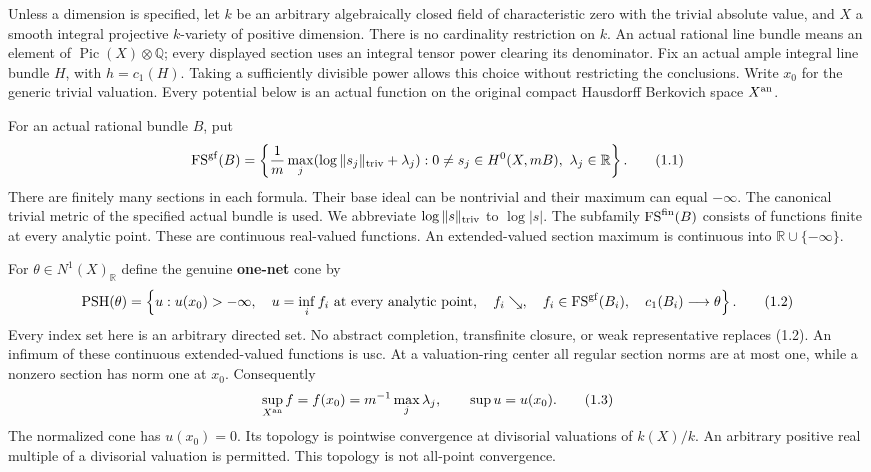 \documentclass[
  10pt,
]{article}
\begin{document}
Unless a dimension is specified, let \(k\) be an arbitrary algebraically
closed field of characteristic zero with the trivial absolute value, and
\(X\) a smooth integral projective \(k\)-variety of positive dimension.
There is no cardinality restriction on \(k\). An actual rational line
bundle means an element of \(\operatorname{Pic}(X)\otimes\mathbb Q\);
every displayed section uses an integral tensor power clearing its
denominator. Fix an actual ample integral line bundle \(H\), with
\(h=c_1(H)\). Taking a sufficiently divisible power allows this choice
without restricting the conclusions. Write \(x_0\) for the generic
trivial valuation. Every potential below is an actual function on the
original compact Hausdorff Berkovich space \(X^{\rm an}\).

For an actual rational bundle \(B\), put \[
 \operatorname{FS}^{\rm gf}(B)=\left\{
  \frac1m\max_j(\log\|s_j\|_{\rm triv}+\lambda_j):
 0\ne s_j\in H^0(X,mB),\ \lambda_j\in\mathbb R
 \right\}.                                                     \tag{1.1}
\] There are finitely many sections in each formula. Their base ideal
can be nontrivial and their maximum can equal \(-\infty\). The canonical
trivial metric of the specified actual bundle is used. We abbreviate
\(\log\|s\|_{\rm triv}\) to \(\log|s|\). The subfamily
\(\operatorname{FS}^{\rm fin}(B)\) consists of functions finite at every
analytic point. These are continuous real-valued functions. An
extended-valued section maximum is continuous into
\(\mathbb R\cup\{-\infty\}\).

For \(\theta\in N^1(X)_{\mathbb R}\) define the genuine \textbf{one-net}
cone by \[
 \operatorname{PSH}(\theta)=\left\{u:
 u(x_0)>-\infty,\quad u=\inf_i f_i\text{ at every analytic point},
 \quad f_i\searrow,\quad f_i\in\operatorname{FS}^{\rm gf}(B_i),
 \quad c_1(B_i)\longrightarrow\theta\right\}.                    \tag{1.2}
\] Every index set here is an arbitrary directed set. No abstract
completion, transfinite closure, or weak representative replaces (1.2).
An infimum of these continuous extended-valued functions is usc. At a
valuation-ring center all regular section norms are at most one, while a
nonzero section has norm one at \(x_0\). Consequently \[
 \sup_{X^{\rm an}} f=f(x_0)=m^{-1}\max_j\lambda_j,
 \qquad \sup u=u(x_0).                                          \tag{1.3}
\] The normalized cone has \(u(x_0)=0\). Its topology is pointwise
convergence at divisorial valuations of \(k(X)/k\). An arbitrary
positive real multiple of a divisorial valuation is permitted. This
topology is not all-point convergence.
\end{document}
